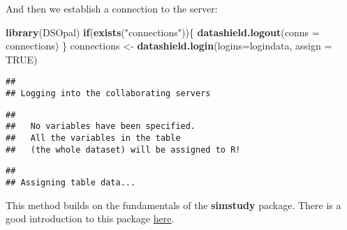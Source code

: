 \documentclass[
]{book}
\newenvironment{Shaded}{\begin{snugshade}}{\end{snugshade}}
\newcommand{\CommentTok}[1]{\textcolor[rgb]{0.56,0.35,0.01}{\textit{#1}}}
\newcommand{\ControlFlowTok}[1]{\textcolor[rgb]{0.13,0.29,0.53}{\textbf{#1}}}
\newcommand{\DataTypeTok}[1]{\textcolor[rgb]{0.13,0.29,0.53}{#1}}
\newcommand{\KeywordTok}[1]{\textcolor[rgb]{0.13,0.29,0.53}{\textbf{#1}}}
\newcommand{\NormalTok}[1]{#1}
\newcommand{\OperatorTok}[1]{\textcolor[rgb]{0.81,0.36,0.00}{\textbf{#1}}}
\newcommand{\OtherTok}[1]{\textcolor[rgb]{0.56,0.35,0.01}{#1}}
\newcommand{\StringTok}[1]{\textcolor[rgb]{0.31,0.60,0.02}{#1}}
\begin{document}
\begin{Shaded}
\end{Shaded}

And then we establish a connection to the server:

\begin{Shaded}
\begin{Highlighting}[]
\KeywordTok{library}\NormalTok{(DSOpal)}
\ControlFlowTok{if}\NormalTok{(}\KeywordTok{exists}\NormalTok{(}\StringTok{"connections"}\NormalTok{))\{}
  \KeywordTok{datashield.logout}\NormalTok{(}\DataTypeTok{conns =}\NormalTok{ connections)}
\NormalTok{\}}
\NormalTok{connections <-}\StringTok{ }\KeywordTok{datashield.login}\NormalTok{(}\DataTypeTok{logins=}\NormalTok{logindata, }\DataTypeTok{assign =} \OtherTok{TRUE}\NormalTok{)}
\end{Highlighting}
\end{Shaded}

\begin{verbatim}
## 
## Logging into the collaborating servers
\end{verbatim}

\begin{verbatim}
## 
##   No variables have been specified. 
##   All the variables in the table 
##   (the whole dataset) will be assigned to R!
\end{verbatim}

\begin{verbatim}
## 
## Assigning table data...
\end{verbatim}

This method builds on the fundamentals of the \textbf{simstudy} package. There is a good introduction to this package \href{https://kgoldfeld.github.io/simstudy/index.html}{here}.
\end{document}
